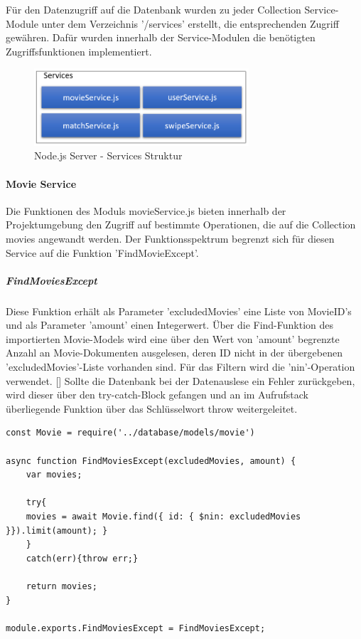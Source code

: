 Für den Datenzugriff auf die Datenbank wurden zu jeder Collection Service-Module unter dem Verzeichnis '/services' erstellt, die entsprechenden Zugriff gewähren. Dafür wurden innerhalb der Service-Modulen  die benötigten Zugriffsfunktionen implementiert.

\begin{figure}[h]
\centering
\includegraphics[width=8cm]{images/serviceStruktur.PNG}
\caption{Node.js Server - Services Struktur}
\end{figure}


%
%

\paragraph{Movie Service}
Die Funktionen des Moduls movieService.js bieten innerhalb der Projektumgebung den Zugriff auf bestimmte Operationen, die  auf die Collection movies angewandt werden. Der Funktionsspektrum begrenzt sich für diesen Service auf die Funktion 'FindMovieExcept'.

\subparagraph{FindMoviesExcept}
Diese Funktion erhält als Parameter 'excludedMovies' eine Liste von MovieID's und als Parameter 'amount' einen Integerwert.
Über die Find-Funktion des importierten Movie-Models wird eine über den Wert von 'amount' begrenzte Anzahl an Movie-Dokumenten ausgelesen, deren ID nicht in der übergebenen 'excludedMovies'-Liste vorhanden sind. Für das Filtern wird die 'nin'-Operation verwendet. [] 
Sollte die Datenbank bei der Datenauslese ein Fehler zurückgeben, wird dieser über den try-catch-Block gefangen und an im Aufrufstack überliegende Funktion über das Schlüsselwort throw weitergeleitet.

\begin{lstlisting}[caption=movieService.js - FindMoviesExcept, label=lst:findmoviesexcept]
const Movie = require('../database/models/movie')

async function FindMoviesExcept(excludedMovies, amount) {
    var movies;

    try{ 
    movies = await Movie.find({ id: { $nin: excludedMovies }}).limit(amount); }
    }
    catch(err){throw err;}

    return movies;
}

module.exports.FindMoviesExcept = FindMoviesExcept;
\end{lstlisting}


